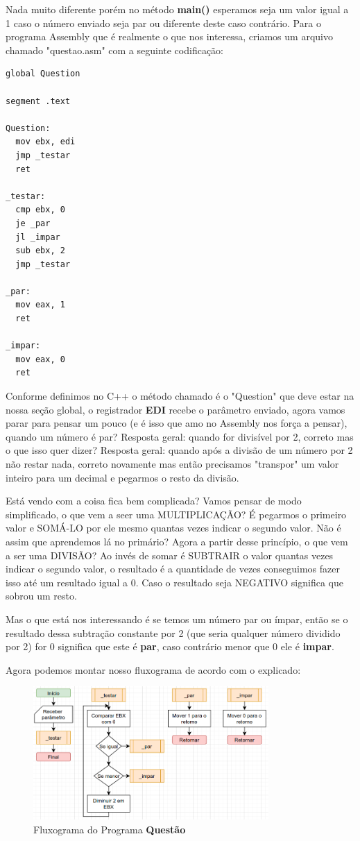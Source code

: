 Nada muito diferente porém no método \textbf{main()} esperamos seja um valor igual a 1 caso o número enviado seja par ou diferente deste caso contrário. Para o programa Assembly que é realmente o que nos interessa, criamos um arquivo chamado "questao.asm" com a seguinte codificação:
\begin{lstlisting}[]
global Question

segment .text

Question:
  mov ebx, edi
  jmp _testar
  ret

_testar:
  cmp ebx, 0
  je _par
  jl _impar
  sub ebx, 2
  jmp _testar	

_par:
  mov eax, 1
  ret

_impar:
  mov eax, 0
  ret
\end{lstlisting}

Conforme definimos no C++ o método chamado é o "Question" que deve estar na nossa seção global, o registrador \textbf{EDI} recebe o parâmetro enviado, agora vamos parar para pensar um pouco (e é isso que amo no Assembly nos força a pensar), quando um número é par? Resposta geral: quando for divisível por 2, correto mas o que isso quer dizer? Resposta geral: quando após a divisão de um número por 2 não restar nada, correto novamente mas então precisamos "transpor" um valor inteiro para um decimal e pegarmos o resto da divisão.

Está vendo com a coisa fica bem complicada? Vamos pensar de modo simplificado, o que vem a seer uma MULTIPLICAÇÃO? É pegarmos o primeiro valor e SOMÁ-LO por ele mesmo quantas vezes indicar o segundo valor. Não é assim que aprendemos lá no primário? Agora a partir desse princípio, o que vem a ser uma DIVISÃO? Ao invés de somar é SUBTRAIR o valor quantas vezes indicar o segundo valor, o resultado é a quantidade de vezes conseguimos fazer isso até um resultado igual a 0. Caso o resultado seja NEGATIVO significa que sobrou um resto. 

Mas o que está nos interessando é se temos um número par ou ímpar, então se o resultado dessa subtração constante por 2 (que seria qualquer número dividido por 2) for 0 significa que este é \textbf{par}, caso contrário menor que 0 ele é \textbf{impar}.

Agora podemos montar nosso fluxograma de acordo com o explicado:
\begin{figure}[H]
	\centering
	\includegraphics[width=0.8\textwidth]{Pictures/cap02/programa6}
	\caption{Fluxograma do Programa \textbf{Questão}}
\end{figure}

